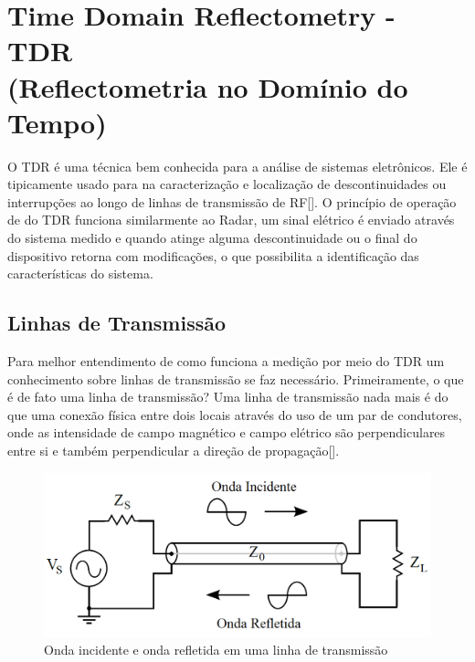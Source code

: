 \chapter{Time Domain Reflectometry - TDR \\ (Reflectometria no Domínio do Tempo)}
\label{TDR}

O TDR é uma técnica bem conhecida para a análise de sistemas eletrônicos. Ele é tipicamente usado para na caracterização e localização de descontinuidades ou interrupções ao longo de linhas de transmissão de RF[\cite{McCabe}]. O princípio de operação de do TDR funciona similarmente ao Radar, um sinal elétrico é enviado através do sistema medido e quando atinge alguma descontinuidade ou o final do dispositivo retorna com modificações, o que possibilita a identificação das características do sistema. 

\section{Linhas de Transmissão}
Para melhor entendimento de como funciona a medição por meio do TDR um conhecimento sobre linhas de transmissão se faz necessário. Primeiramente, o que é de fato uma linha de transmissão? Uma linha de transmissão nada mais é do que uma conexão física entre dois locais através do uso de um par de condutores, onde as intensidade de campo magnético e campo elétrico são perpendiculares entre si e também perpendicular a direção de propagação[\cite{Ida}]. 

\begin{figure}[htb!]
	\begin{center}
		\includegraphics[scale=.4]{./cap2/figuras/incident_reflected.png}
		\caption{Onda incidente e onda refletida em uma linha de transmissão}
		\label{fig:inc_ref}
	\end{center}
\end{figure}

